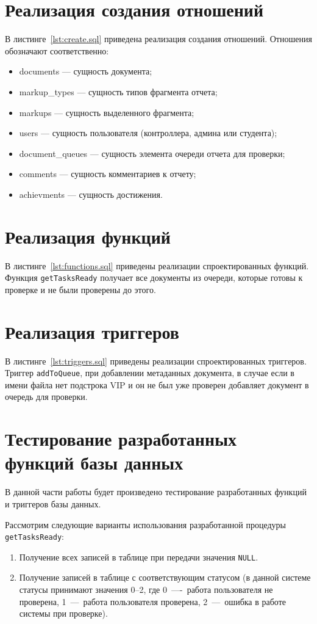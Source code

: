\section{Реализация создания отношений}
В листинге~\ref{lst:create.sql} приведена реализация создания отношений.
Отношения обозначают соответственно:
\begin{itemize}
	\item documents --- сущность документа;
	\item markup\_types --- сущность типов фрагмента отчета;
	\item markups --- сущность выделенного фрагмента;
	\item users --- сущность пользователя (контроллера, админа или студента);
	\item document\_queues --- сущность элемента очереди отчета для проверки;
	\item comments --- сущность комментариев к отчету;
	\item achievments --- сущность достижения.
\end{itemize}


\section{Реализация функций}
В листинге~\ref{lst:functions.sql} приведены реализации спроектированных
функций. Функция \texttt{getTasksReady} получает все документы из очереди,
которые готовы к проверке и не были проверены до этого.

\section{Реализация триггеров}
В листинге~\ref{lst:triggers.sql} приведены реализации спроектированных
триггеров. Триггер \texttt{addToQueue}, при добавлении метаданных документа, в
случае если в имени файла нет подстрока VIP и он не был уже проверен добавляет
документ в очередь для проверки.

\section{Тестирование разработанных функций базы данных}
В данной части работы будет произведено тестирование разработанных функций и
триггеров базы данных.

Рассмотрим следующие варианты использования разработанной процедуры
\texttt{getTasksReady}:
\begin{enumerate}
	\item Получение всех записей в таблице при передачи значения \texttt{NULL}.
	\item Получение записей в таблице с соответствующим статусом (в данной системе
	статусы принимают значения 0--2, где 0~----~работа пользователя не проверена,
	1~---~работа пользователя проверена, 2~---~ошибка в работе системы при
	проверке).
\end{enumerate}

